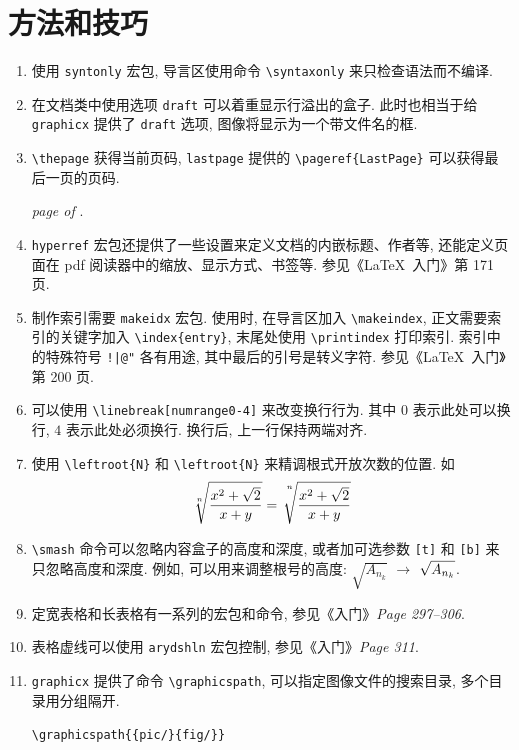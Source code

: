 \documentclass[UTF8,no-math]{ctexart}
\numberwithin{enumi}{section}
\begin{document}
    \section{方法和技巧}
    \begin{enumerate}
        \item 使用 \texttt{syntonly} 宏包, 导言区使用命令 \verb|\syntaxonly| 来只检查语法而不编译. 
        \item 在文档类中使用选项 \texttt{draft} 可以着重显示行溢出的盒子. 此时也相当于给 \texttt{graphicx} 提供了 \verb|draft| 选项, 图像将显示为一个带文件名的框. 
        \item \verb|\thepage| 获得当前页码, \texttt{lastpage} 提供的 \verb|\pageref{LastPage}| 可以获得最后一页的页码. \par \emph{page {\thepage} of \pageref{LastPage}}.
        \item \texttt{hyperref} 宏包还提供了一些设置来定义文档的内嵌标题、作者等, 还能定义页面在 pdf 阅读器中的缩放、显示方式、书签等. 参见《\LaTeX\ 入门》第 171 页. 
        \item 制作索引需要 \texttt{makeidx} 宏包. 使用时, 在导言区加入 \verb|\makeindex|, 正文需要索引的关键字加入 \verb|\index{entry}|, 末尾处使用 \verb|\printindex| 打印索引. 索引中的特殊符号 \verb+!|@"+ 各有用途, 其中最后的引号是转义字符. 参见《\LaTeX\ 入门》第 200 页.
        \item 可以使用 \verb|\linebreak[numrange0-4]| 来改变换行行为. 其中 $0$ 表示此处可以换行, $4$ 表示此处必须换行. 换行后, 上一行保持两端对齐. 
        \item 使用 \verb|\leftroot{N}| 和 \verb|\leftroot{N}| 来精调根式开放次数的位置. 如
        \begin{equation}
            \sqrt[n]{\frac{x^2+\sqrt2}{x+y}}=\sqrt[\uproot{16}\leftroot{-2}n]{\frac{x^2+\sqrt2}{x+y}}
        \end{equation}
        \item \verb|\smash| 命令可以忽略内容盒子的高度和深度, 或者加可选参数 \verb|[t]| 和 \verb|[b]| 来只忽略高度和深度. 例如, 可以用来调整根号的高度: $\sqrt{A_{n_k}}$ $\to$ $\sqrt{\smash[b]{A_{n_k}}}$.
        \item 定宽表格和长表格有一系列的宏包和命令, 参见《入门》\emph{Page 297--306}.
        \item 表格虚线可以使用 \texttt{arydshln} 宏包控制, 参见《入门》\emph{Page 311}.
        \item \texttt{graphicx} 提供了命令 \verb|\graphicspath|, 可以指定图像文件的搜索目录, 多个目录用分组隔开. \par \verb|\graphicspath{{pic/}{fig/}}|
    \end{enumerate}
\end{document}
